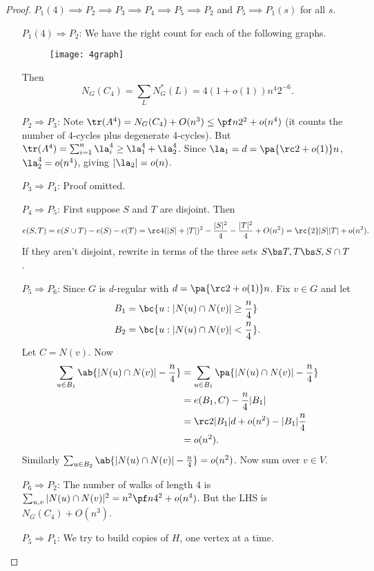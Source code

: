 \begin{proof}
$P_1(4)\implies P_2\implies P_3\implies P_4\implies P_5\implies P_2$ and $P_5\implies P_1(s)$ for all $s$.

\begin{enumerate}
\item
[$P_1(4)\Rightarrow P_2$:] We have the right count for each of the following graphs.
\begin{figure}[h!]
\centering
\texttt{[image: 4graph]}
\end{figure}

Then
\[
N_G(C_4)=\sum_L N_G^*(L)=4(1+o(1))n^4 2^{-6}.
\]
\item
[$P_2\Rightarrow P_3$:] Note $\tr(A^4)=N_G(C_4)+O(n^3)\le \pf n2^2+o(n^4)$ (it counts the number of $4$-cycles plus degenerate 4-cycles). But $\tr(A^4)=\sum_{i=1}^n \la_i^4\ge \la_1^4+\la_2^4$. Since $\la_1=d=\pa{\rc 2+o(1)}n$, $\la_2^4=o(n^4)$, giving $|\la_2|=o(n)$.
\item
[$P_3\Rightarrow P_4$:] Proof omitted.
\item
[$P_4\Rightarrow P_5$:] First suppose $S$ and $T$ are disjoint. Then \[e(S,T)=e(S\cup T)-e(S)-e(T)=\rc4 (|S|+|T|)^2-\frac{|S|^2}{4}-\frac{|T|^2}{4}+O(n^2)=\rc{2}|S||T|+o(n^2).\]
If they aren't disjoint, rewrite in terms of the three sets $S\bs T,T\bs S,S\cap T$.
\item
[$P_5\Rightarrow P_6$:] Since $G$ is $d$-regular with $d=\pa{\rc2+o(1)}n$. Fix $v\in G$ and let
\begin{align*}
B_1&=\bc{u:|N(u)\cap N(v)|\ge \frac n4}\\
B_2&=\bc{u:|N(u)\cap N(v)|<\frac n4}.
\end{align*}
Let $C=N(v)$. Now
\begin{align*}
\sum_{u\in B_1}\ab{|N(u)\cap N(v)|-\frac n4}
&=\sum_{u\in B_1}\pa{|N(u)\cap N(v)|-\frac n4}\\
&=e(B_1,C)-\frac n4 |B_1|\\
&=\rc2 |B_1|d+o(n^2)-|B_1|\frac n4\\
&=o(n^2).
\end{align*}
Similarly $\sum_{u\in B_2}\ab{|N(u)\cap N(v)|-\frac n4}=o(n^2)$. Now sum over $v\in V$.
\item [$P_6\Rightarrow P_2$:] The number of walks of length 4 is $\sum_{u,v}|N(u)\cap N(v)|^2=n^2\pf n4^2 +o(n^4)$. %
But the LHS is $N_G(C_4)+O(n^3)$.

\item [$P_5\Rightarrow P_1$:] We try to build copies of $H$, one vertex at a time.


\end{enumerate}
\end{proof}
